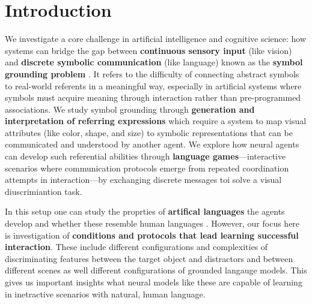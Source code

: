 \documentclass[11pt]{article}
\begin{document}


\section{Introduction} %

We investigate a core challenge in artificial
intelligence and cognitive science: how systems can bridge the gap
between \textbf{continuous sensory input} (like vision) and
\textbf{discrete symbolic communication} (like language) known
as the \textbf{symbol grounding problem} \citep{Harnad1990}. It refers to the difficulty of connecting abstract symbols to
real-world referents in a meaningful way, especially in artificial
systems where symbols must acquire meaning through interaction rather
than pre-programmed associations.
%
We study symbol grounding through \textbf{generation and interpretation of referring expressions} which
require a system to map
visual attributes (like color, shape, and size) to symbolic
representations that can be communicated and understood by another
agent. %
We explore  %
how neural
agents can develop such referential abilities through \textbf{language
  games}---interactive scenarios where communication protocols emerge from
repeated coordination attempts in interaction---by exchanging discrete messages toi solve a visual diuscrimiantion task. %

In this setup one can study the proprties of \textbf{artifical
  languages} the agents develop and whether these resemble human
languages \citep{Bartlett2005,Kirby2008,Steels2009,Kharitonov2019,Lazaridou2017}. However, our focus here is investigation of
\textbf{conditions and protocols that lead learning successful
  interaction}. These include different configurations and
complexities of discriminating features between the target object and
distractors and between different scenes as well different
configurations of grounded langauge models. This gives us important
insights what neural models like these are capable of learning in
inetractive scenarios with natural, human language.
\end{document}
